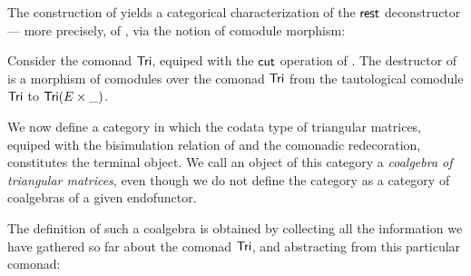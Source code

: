 \documentclass[conference,10pt]{IEEEtran}
\begin{document}
The construction of  yields a categorical characterization of the $\mathsf{rest}$ deconstructor---%
more precisely, of , via the notion of comodule morphism:


\begin{example}\label{ex:tail_comodule}
 Consider the comonad $\mathsf{Tri}$, equiped with the $\mathsf{cut}$ operation of .
 The destructor \constfont{\tail} of  is a morphism of comodules over the comonad $\mathsf{Tri}$ 
  from the tautological comodule  $\mathsf{Tri}$ to $\mathsf{Tri}(E\times \_)$.
\end{example}








We now define a category in which the codata type of triangular matrices, equiped with the bisimulation relation of 
and the comonadic redecoration, constitutes the terminal object. We call an object of this category a \emph{coalgebra of triangular matrices}, 
even though we do not define the category as a category of coalgebras of a given endofunctor.

The definition of such a coalgebra is obtained by collecting all the information we have gathered so
far about the comonad $\mathsf{Tri}$, and abstracting from this particular comonad:
\end{document}

